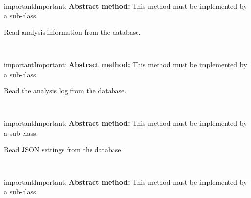 \documentclass[letterpaper,10pt,english]{sphinxmanual}
\begin{document}
\begin{fulllineitems}
\begin{fulllineitems}
\end{fulllineitems}


\begin{fulllineitems}
\label{api-doc/mosaic.meta:mosaic.metaMDIO.metaMDIO.readAnalysisInfo}~
\begin{notice}{important}{Important:}
\textbf{Abstract method:} This method must be implemented by a sub-class.
\end{notice}

Read analysis information from the database.

\end{fulllineitems}


\begin{fulllineitems}
\label{api-doc/mosaic.meta:mosaic.metaMDIO.metaMDIO.readAnalysisLog}~
\begin{notice}{important}{Important:}
\textbf{Abstract method:} This method must be implemented by a sub-class.
\end{notice}

Read the analysis log from the database.

\end{fulllineitems}


\begin{fulllineitems}
\label{api-doc/mosaic.meta:mosaic.metaMDIO.metaMDIO.readSettings}~
\begin{notice}{important}{Important:}
\textbf{Abstract method:} This method must be implemented by a sub-class.
\end{notice}

Read JSON settings from the database.

\end{fulllineitems}


\begin{fulllineitems}
\label{api-doc/mosaic.meta:mosaic.metaMDIO.metaMDIO.writeAnalysisInfo}~
\begin{notice}{important}{Important:}
\textbf{Abstract method:} This method must be implemented by a sub-class.
\end{notice}


\end{fulllineitems}
\end{fulllineitems}
\end{document}
